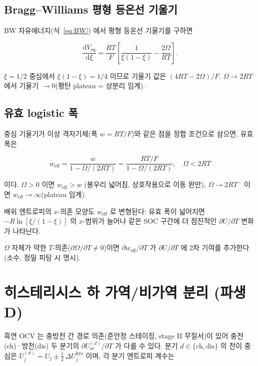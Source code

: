 \documentclass[11pt,a4paper]{article}
\newcommand{\dd}{\mathrm{d}}
\newcommand{\eq}{\mathrm{eq}}
\newcommand{\oc}{\mathrm{oc}}
\newcommand{\eff}{\mathrm{eff}}
\newcommand{\hys}{\mathrm{hys}}
\begin{document}
\subsection{Bragg--Williams 평형 등온선 기울기}

BW 자유에너지(식~\eqref{eq:BW}) 에서 평형 등온선 기울기를 구하면

\begin{equation}
  \frac{\dd V_\eq}{\dd \xi}
  = \frac{RT}{F}\left[\frac{1}{\xi(1-\xi)} - \frac{2\Omega}{RT}\right].
  \label{eq:isothermal_slope}
\end{equation}

$\xi = 1/2$ 중심에서 $\xi(1-\xi) = 1/4$ 이므로 기울기 값은 $(4RT - 2\Omega)/F$.
$\Omega \to 2RT$ 에서 기울기 $\to 0$(평탄 plateau = 상분리 임계).

\subsection{유효 logistic 폭}

중심 기울기가 이상 격자기체(폭 $w=RT/F$)와 같은 점을 정합 조건으로 삼으면,
유효 폭은

\begin{equation}
  \boxed{\;
    w_\eff = \frac{w}{1 - \Omega/(2RT)}
    = \frac{RT/F}{1 - \Omega/(2RT)}, \quad \Omega < 2RT
  \;}
  \label{eq:weff}
\end{equation}

이다. $\Omega > 0$ 이면 $w_\eff > w$ (봉우리 넓어짐, 상호작용으로 이동 완만),
$\Omega \to 2RT^-$ 이면 $w_\eff \to \infty$(plateau 임계).

배위 엔트로피의 $x$-의존 모양도 $w_\eff$ 로 변형된다: 유효 폭이 넓어지면
$-R\ln[\xi/(1-\xi)]$ 의 $x$-범위가 늘어나 같은 SOC 구간에 더 점진적인
$\partial U/\partial T$ 변화가 나타난다.

$\Omega$ 자체가 약한 $T$-의존($\partial\Omega/\partial T \ne 0$)이면
$\partial w_\eff/\partial T$ 가 $\partial U/\partial T$ 에 2차 기여를 추가한다(소수, 정밀 피팅 시 명시).

\section{히스테리시스 하 가역/비가역 분리 (파생 D)}\label{sec:hysteresis}

흑연 OCV 는 충방전 간 경로 의존(준안정 스테이징, stage II 무질서)이 있어
충전(ch)·방전(dis) 두 분기의 $\partial U_\oc^{(d)}/\partial T$ 가 다를 수 있다.
분기 $d \in \{\mathrm{ch},\mathrm{dis}\}$ 의 전이 중심은 $U_j^{(d)} = U_j \pm \tfrac12\,\Delta U_j^\hys$ 이며,
각 분기 엔트로피 계수는
\end{document}

